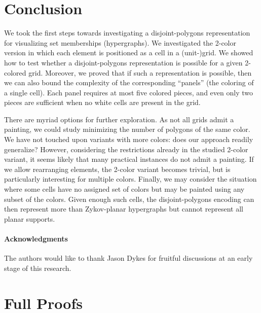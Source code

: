 \documentclass[runningheads]{llncs}
\begin{document}
\section{Conclusion}
\label{sec:conclusion}

We took the first steps towards investigating a disjoint-polygons representation for visualizing set memberships (hypergraphs).
We investigated the 2-color version in which each element is positioned as a cell in a (unit-)grid.
We showed how to test whether a disjoint-polygons representation is possible for a given 2-colored grid.
Moreover, we proved that if such a representation is possible, then we can also bound the complexity of the corresponding ``panels'' (the coloring of a single cell).
Each panel requires at most five colored pieces, and even only two pieces are sufficient when no white cells are present in the grid.

There are myriad options for further exploration.
As not all grids admit a painting, we could study minimizing the number of polygons of the same color.
We have not touched upon variants with more colors: does our approach readily generalize?
However, considering the restrictions already in the studied 2-color variant, it seems likely that many practical instances do not admit a painting.
If we allow rearranging elements, the 2-color variant becomes trivial, but is particularly interesting for multiple colors.
Finally, we may consider the situation where some cells have no assigned set of colors but may be painted using any subset of the colors.
Given enough such cells, the disjoint-polygons encoding can then represent more than Zykov-planar hypergraphs but cannot represent all planar supports.

\paragraph{Acknowledgments}
The authors would like to thank Jason Dykes for fruitful discussions at an early stage of this research.

\clearpage



\clearpage
\appendix

\section{Full Proofs}
\end{document}
